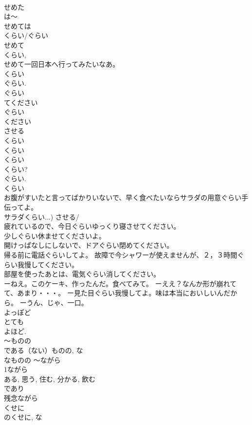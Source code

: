 \documentclass[8pt]{extreport}
\begin{document}
\begin{CJK}{UTF8}{min}
\\	せめた
\\	は～ 
\\	せめては
\\	くらい/ぐらい 
\\	せめて 
\\	くらい, 
\\	せめて一回日本へ行ってみたいなあ。 
\\	くらい 
\\	ぐらい. 
\\	ぐらい
\\	てください 
\\	ぐらい
\\	ください 
\\	させる 
\\	くらい
\\	くらい
\\	くらい
\\	くらい? 
\\	ぐらい. 
\\	くらい
\\	お腹がすいたと言ってばかりいないで、早く食べたいならサラダの用意ぐらい手伝ってよ。 
\\	サラダくらい...) させる/
\\	疲れているので、今日ぐらいゆっくり寝させてください。 
\\	少しぐらい休ませてくださいよ。 
\\	開けっぱなしにしないで、ドアぐらい閉めてください。 
\\	帰る前に電話ぐらいしてよ。 故障で今シャワーが使えませんが、２，３時間ぐらい我慢してください。 
\\	部屋を使ったあとは、電気ぐらい消してください。 
\\	ーねえ。このケーキ、作ったんだ。食べてみて。 ーええ？なんか形が崩れてて、あまり・・・。 ー見た目ぐらい我慢してよ。味は本当においしいんだから。 ーうん、じゃ、一口。
\\	よっぽど	
\\	とても 
\\	よほど.
\\	～ものの	
\\	である（ない）ものの, な
\\	なものの ～ながら 
\\	1ながら
\\	ある, 思う, 住む, 分かる, 飲む
\\	であり 
\\	残念ながら 
\\	くせに 
\\	のくせに, な

\end{CJK}
\end{document}
